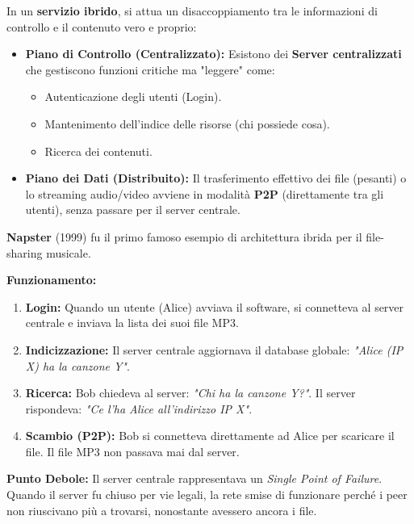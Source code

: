 \documentclass[a4paper,12pt]{report}
\begin{document}
In un \textbf{servizio ibrido}, si attua un disaccoppiamento tra le informazioni di controllo e il contenuto vero e proprio:

\begin{itemize}
    \item \textbf{Piano di Controllo (Centralizzato):} Esistono dei \textbf{Server centralizzati} che gestiscono funzioni critiche ma "leggere" come:
    \begin{itemize}
        \item Autenticazione degli utenti (Login).
        \item Mantenimento dell'indice delle risorse (chi possiede cosa).
        \item Ricerca dei contenuti.
    \end{itemize}
    \item \textbf{Piano dei Dati (Distribuito):} Il trasferimento effettivo dei file (pesanti) o lo streaming audio/video avviene in modalità \textbf{P2P} (direttamente tra gli utenti), senza passare per il server centrale.
\end{itemize}

\begin{notebox}
\textbf{Napster} (1999) fu il primo famoso esempio di architettura ibrida per il file-sharing musicale.

\textbf{Funzionamento:}
\begin{enumerate}
    \item \textbf{Login:} Quando un utente (Alice) avviava il software, si connetteva al server centrale e inviava la lista dei suoi file MP3.
    \item \textbf{Indicizzazione:} Il server centrale aggiornava il database globale: \textit{"Alice (IP X) ha la canzone Y"}.
    \item \textbf{Ricerca:} Bob chiedeva al server: \textit{"Chi ha la canzone Y?"}. Il server rispondeva: \textit{"Ce l'ha Alice all'indirizzo IP X"}.
    \item \textbf{Scambio (P2P):} Bob si connetteva direttamente ad Alice per scaricare il file. Il file MP3 non passava mai dal server.
\end{enumerate}

\textbf{Punto Debole:} Il server centrale rappresentava un \textit{Single Point of Failure}. Quando il server fu chiuso per vie legali, la rete smise di funzionare perché i peer non riuscivano più a trovarsi, nonostante avessero ancora i file.
\end{notebox}
\end{document}

